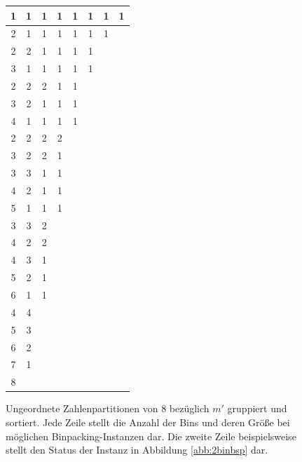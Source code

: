 \documentclass{scrreprt}
\begin{document}
\begin{figure}
    \begin{center}
        \begin{tabular}{cccccccc}
            1 & 1 & 1 & 1 & 1 & 1 & 1 & 1  \\ \hline
            2 & 1 & 1 & 1 & 1 & 1 & 1 & \\ \hline
            2 & 2 & 1 & 1 & 1 & 1 & &\\
            3 & 1 & 1 & 1 & 1 & 1 & &\\ \hline
            2 & 2 & 2 & 1 & 1 & & &\\
            3 & 2 & 1 & 1 & 1 & & &\\
            4 & 1 & 1 & 1 & 1 & & &\\ \hline
            2 & 2 & 2 & 2 & & & &\\
            3 & 2 & 2 & 1 & & & &\\
            3 & 3 & 1 & 1 & & & &\\
            4 & 2 & 1 & 1 & & & &\\
            5 & 1 & 1 & 1 & & & &\\ \hline
            3 & 3 & 2 & & & & &\\
            4 & 2 & 2 & & & & &\\
            4 & 3 & 1 & & & & &\\
            5 & 2 & 1 & & & & &\\
            6 & 1 & 1 & & & & &\\ \hline
            4 & 4 & & & & & &\\
            5 & 3 & & & & & &\\
            6 & 2 & & & & & &\\
            7 & 1 & & & & & &\\ \hline
            8 & & & & & & &
        \end{tabular}
    \end{center}
    \caption{
        \label{abb:binpart}
        Ungeordnete Zahlenpartitionen von $8$ bezüglich $m'$ gruppiert und sortiert.
        Jede Zeile stellt die Anzahl der Bins und deren Größe bei möglichen Binpacking-Instanzen dar.
        Die zweite Zeile beispielsweise stellt den Status der Instanz in Abbildung \ref{abb:2binbsp} dar.
    }
\end{figure}
\end{document}
